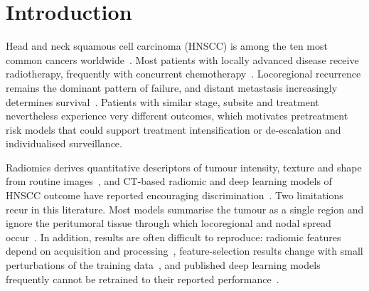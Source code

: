 \documentclass[11pt,a4paper]{article}
\begin{document}
\begin{abstract}
\noindent\textbf{Keywords:} Head and neck cancer, Radiomics, Graph neural network, Graph attention network, Feature selection, Reproducibility, Variance decomposition, External validation, Radiotherapy outcome
\end{abstract}


\section{Introduction}\label{sec:intro}

Head and neck squamous cell carcinoma (HNSCC) is among the ten most common cancers worldwide~\cite{sung2021globocan}. Most patients with locally advanced disease receive radiotherapy, frequently with concurrent chemotherapy~\cite{chow2020}. Locoregional recurrence remains the dominant pattern of failure, and distant metastasis increasingly determines survival~\cite{leeman2017}. Patients with similar stage, subsite and treatment nevertheless experience very different outcomes, which motivates pretreatment risk models that could support treatment intensification or de-escalation and individualised surveillance.

Radiomics derives quantitative descriptors of tumour intensity, texture and shape from routine images~\cite{lambin2012,aerts2014}, and CT-based radiomic and deep learning models of HNSCC outcome have reported encouraging discrimination~\cite{vallieres2017,diamant2019,kazmierski2023}. Two limitations recur in this literature. Most models summarise the tumour as a single region and ignore the peritumoral tissue through which locoregional and nodal spread occur~\cite{keek2020}. In addition, results are often difficult to reproduce: radiomic features depend on acquisition and processing~\cite{traverso2018,zwanenburg2020ibsi}, feature-selection results change with small perturbations of the training data~\cite{kalousis2007,nogueira2018,demircioglu2022}, and published deep learning models frequently cannot be retrained to their reported performance~\cite{mateus2023}.
\end{document}
